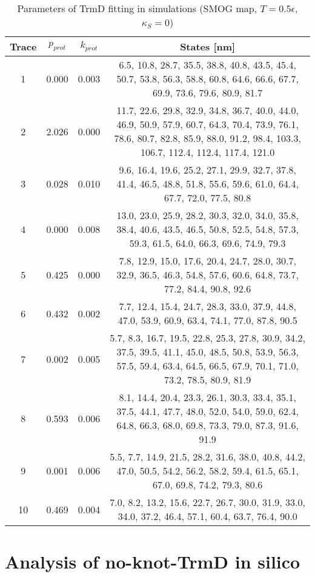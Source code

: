 \begin{table}
    \centering
    \caption{Parameters of TrmD fitting in simulations (SMOG map, $T=0.5\epsilon$, $\kappa_S=0$)}
    \label{tab:trmd-sd-parameters}
    \begin{tabular}{c|c|c|c}
        \textbf{Trace} & \textbf{$p_{prot}$} & \textbf{$k_{prot}$} & \textbf{States [nm]}\\\hline
        1 & 0.000 & 0.003 & 6.5, 10.8, 28.7, 35.5, 38.8, 40.8, 43.5, 45.4, 50.7, 53.8, 56.3, 58.8, 60.8, 64.6, 66.6, 67.7, 69.9, 73.6, 79.6, 80.9, 81.7\\
        2 & 2.026 & 0.000 & 11.7, 22.6, 29.8, 32.9, 34.8, 36.7, 40.0, 44.0, 46.9, 50.9, 57.9, 60.7, 64.3, 70.4, 73.9, 76.1, 78.6, 80.7, 82.8, 85.9, 88.0, 91.2, 98.4, 103.3, 106.7, 112.4, 112.4, 117.4, 121.0\\
        3 & 0.028 & 0.010 & 9.6, 16.4, 19.6, 25.2, 27.1, 29.9, 32.7, 37.8, 41.4, 46.5, 48.8, 51.8, 55.6, 59.6, 61.0, 64.4, 67.7, 72.0, 77.5, 80.8\\
        4 & 0.000 & 0.008 & 13.0, 23.0, 25.9, 28.2, 30.3, 32.0, 34.0, 35.8, 38.4, 40.6, 43.5, 46.5, 50.8, 52.5, 54.8, 57.3, 59.3, 61.5, 64.0, 66.3, 69.6, 74.9, 79.3\\
        5 & 0.425 & 0.000 & 7.8, 12.9, 15.0, 17.6, 20.4, 24.7, 28.0, 30.7, 32.9, 36.5, 46.3, 54.8, 57.6, 60.6, 64.8, 73.7, 77.2, 84.4, 90.8, 92.6\\
        6 & 0.432 & 0.002 & 7.7, 12.4, 15.4, 24.7, 28.3, 33.0, 37.9, 44.8, 47.0, 53.9, 60.9, 63.4, 74.1, 77.0, 87.8, 90.5\\
        7 & 0.002 & 0.005 & 5.7, 8.3, 16.7, 19.5, 22.8, 25.3, 27.8, 30.9, 34.2, 37.5, 39.5, 41.1, 45.0, 48.5, 50.8, 53.9, 56.3, 57.5, 59.4, 63.4, 64.5, 66.5, 67.9, 70.1, 71.0, 73.2, 78.5, 80.9, 81.9\\
        8 & 0.593 & 0.006 & 8.1, 14.4, 20.4, 23.3, 26.1, 30.3, 33.4, 35.1, 37.5, 44.1, 47.7, 48.0, 52.0, 54.0, 59.0, 62.4, 64.8, 66.3, 68.0, 69.8, 73.3, 79.0, 87.3, 91.6, 91.9\\
        9 & 0.001 & 0.006 & 5.5, 7.7, 14.9, 21.5, 28.2, 31.6, 38.0, 40.8, 44.2, 47.0, 50.5, 54.2, 56.2, 58.2, 59.4, 61.5, 65.1, 67.0, 69.8, 74.2, 79.3, 80.6\\
        10 & 0.469 & 0.004 & 7.0, 8.2, 13.2, 15.6, 22.7, 26.7, 30.0, 31.9, 33.0, 34.0, 37.2, 46.4, 57.1, 60.4, 63.7, 76.4, 90.0\\\hline
    \end{tabular}
\end{table}

\section{Analysis of no-knot-TrmD in silico}
\label{sec:fit-details-no-knot-trmd-theory}

